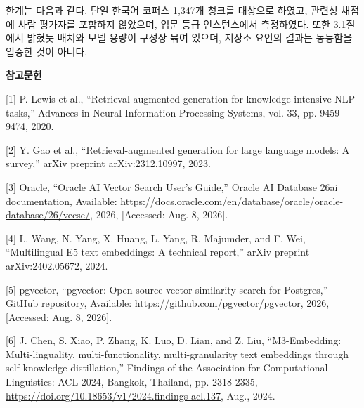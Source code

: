 \documentclass[10pt,a4paper,twocolumn]{article}
\newcommand{\pgspecial}[1]{\par\vspace{5pt}\begin{center}{\bfseries\fontsize{12}{14}\selectfont #1}\end{center}\vspace{2pt}}
\begin{document}
한계는 다음과 같다. 단일 한국어 코퍼스 1,347개 청크를 대상으로 하였고, 관련성 채점에 사람 평가자를 포함하지 않았으며, 입문 등급 인스턴스에서 측정하였다. 또한 3.1절에서 밝혔듯 배치와 모델 용량이 구성상 묶여 있으며, 저장소 요인의 결과는 동등함을 입증한 것이 아니다.

\pgspecial{참고문헌}

{\setlength{\parskip}{0pt}\fontsize{8}{9.2}\selectfont\raggedright

\noindent\hangindent=0.5cm
[1] P. Lewis et al., ``Retrieval-augmented generation for knowledge-intensive NLP tasks,'' Advances in Neural Information Processing Systems, vol. 33, pp. 9459-9474, 2020.
\par\vspace{0pt}

\noindent\hangindent=0.5cm
[2] Y. Gao et al., ``Retrieval-augmented generation for large language models: A survey,'' arXiv preprint arXiv:2312.10997, 2023.
\par\vspace{0pt}

\noindent\hangindent=0.5cm
[3] Oracle, ``Oracle AI Vector Search User's Guide,'' Oracle AI Database 26ai documentation, Available: \url{https://docs.oracle.com/en/database/oracle/oracle-database/26/vecse/}, 2026, [Accessed: Aug. 8, 2026].
\par\vspace{0pt}

\noindent\hangindent=0.5cm
[4] L. Wang, N. Yang, X. Huang, L. Yang, R. Majumder, and F. Wei, ``Multilingual E5 text embeddings: A technical report,'' arXiv preprint arXiv:2402.05672, 2024.
\par\vspace{0pt}

\noindent\hangindent=0.5cm
[5] pgvector, ``pgvector: Open-source vector similarity search for Postgres,'' GitHub repository, Available: \url{https://github.com/pgvector/pgvector}, 2026, [Accessed: Aug. 8, 2026].
\par\vspace{0pt}

\noindent\hangindent=0.5cm
[6] J. Chen, S. Xiao, P. Zhang, K. Luo, D. Lian, and Z. Liu, ``M3-Embedding: Multi-linguality, multi-functionality, multi-granularity text embeddings through self-knowledge distillation,'' Findings of the Association for Computational Linguistics: ACL 2024, Bangkok, Thailand, pp. 2318-2335, \url{https://doi.org/10.18653/v1/2024.findings-acl.137}, Aug., 2024.
\par\vspace{0pt}

}
\end{document}
